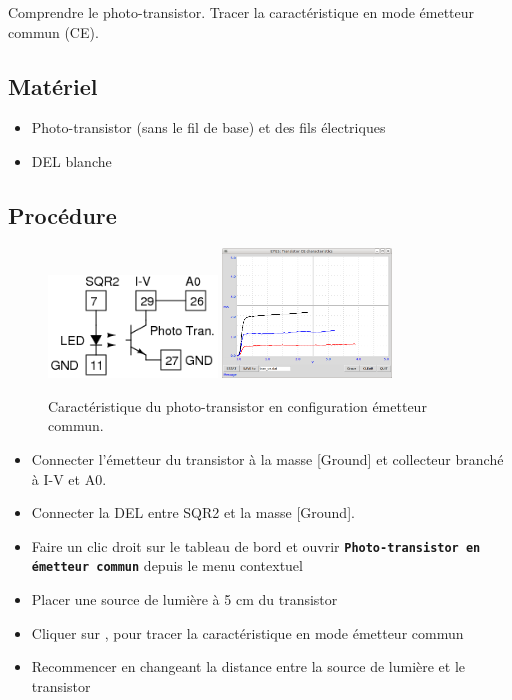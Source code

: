 \documentclass{book}
\newcommand{\nop}{}
\begin{document}
Comprendre le photo-transistor. Tracer la caractéristique en mode émetteur commun (CE).




\subsection{Matériel}


\begin{itemize}
  \item Photo-transistor (sans le fil de base) et des fils électriques
  \item DEL blanche
\end{itemize}

\subsection{Procédure}


\begin{figure}[h!]
\begin{center}
\caption{\label{fig:CE-char phototran}Caractéristique du photo-transistor en configuration émetteur commun. }\vspace{0.5em}
\includegraphics[width=0.4\textwidth, height=0.3\textwidth, keepaspectratio]{Schematic-phtran-ce.png}
\includegraphics[width=0.4\textwidth, height=0.3\textwidth, keepaspectratio]{Pic-photo-tran-ce.png}
\end{center}
\end{figure}



\begin{itemize}
  \item Connecter l'émetteur du transistor à la masse [Ground] et collecteur branché à I-V et A0.
  \item Connecter  la DEL entre SQR2 et la masse [Ground].
  \item Faire un clic droit sur le tableau de bord et ouvrir  \texttt{\textbf{Photo-transistor en émetteur commun}\nop} depuis le menu contextuel
  \item Placer une source de lumière à 5 cm du transistor
  \item Cliquer sur  , pour tracer la caractéristique en mode émetteur commun
  \item Recommencer en changeant la distance entre la source de lumière et le transistor
\end{itemize}
\end{document}
